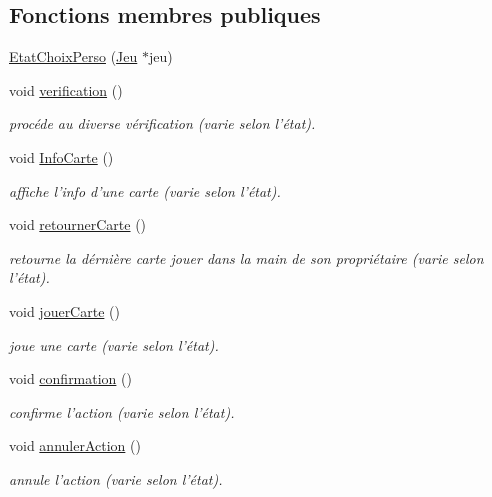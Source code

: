 \subsection*{Fonctions membres publiques}
\begin{DoxyCompactItemize}
\item 
\hyperlink{class_etat_choix_perso_a95d459d52f71990384b6284739c0700e}{Etat\-Choix\-Perso} (\hyperlink{class_jeu}{Jeu} $\ast$jeu)
\item 
void \hyperlink{class_etat_choix_perso_a18678f06f60115999dd92b8b88dbe7dd}{verification} ()
\begin{DoxyCompactList}\small\item\em procéde au diverse vérification (varie selon l'état). \end{DoxyCompactList}\item 
void \hyperlink{class_etat_choix_perso_a10dcb32108b4d457bd58ad45abf6706a}{Info\-Carte} ()
\begin{DoxyCompactList}\small\item\em affiche l'info d'une carte (varie selon l'état). \end{DoxyCompactList}\item 
void \hyperlink{class_etat_choix_perso_a5a9e8efb87e8ebb31c0f4db269e938a9}{retourner\-Carte} ()
\begin{DoxyCompactList}\small\item\em retourne la dérnière carte jouer dans la main de son propriétaire (varie selon l'état). \end{DoxyCompactList}\item 
void \hyperlink{class_etat_choix_perso_a31908b4127aeff26b214d470ef22eacb}{jouer\-Carte} ()
\begin{DoxyCompactList}\small\item\em joue une carte (varie selon l'état). \end{DoxyCompactList}\item 
void \hyperlink{class_etat_choix_perso_a60ea227168029d7741f2919d73b8d2cc}{confirmation} ()
\begin{DoxyCompactList}\small\item\em confirme l'action (varie selon l'état). \end{DoxyCompactList}\item 
void \hyperlink{class_etat_choix_perso_a1a67ae6bf8cf6cd9c79afd84b1961385}{annuler\-Action} ()
\begin{DoxyCompactList}\small\item\em annule l'action (varie selon l'état). \end{DoxyCompactList}\end{DoxyCompactItemize}


